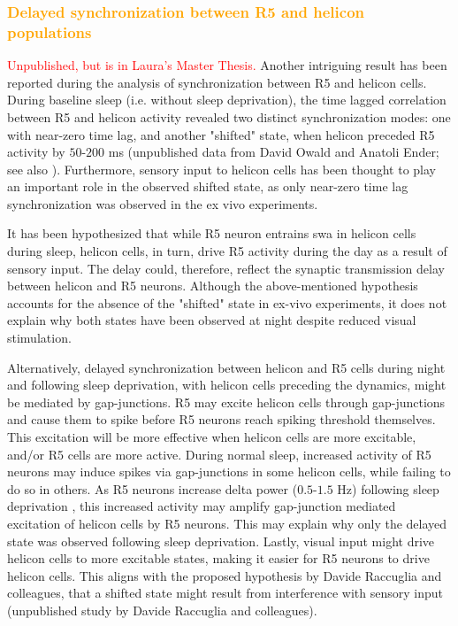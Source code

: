 \documentclass[../main.tex]{subfiles}
\begin{document}
\subsubsection{\textcolor{orange}{Delayed synchronization between R5 and helicon populations}}\label{subsubsec:delayed_synch_r5_helicon}

\textcolor{red}{Unpublished, but is in Laura's Master Thesis.} Another intriguing result has been reported during the analysis of synchronization between R5 and helicon cells. During baseline sleep (i.e. without sleep deprivation), the time lagged correlation between R5 and helicon activity revealed two distinct synchronization modes: one with near-zero time lag, and another "shifted" state, when helicon preceded R5 activity by $50$-$200$ ms (unpublished data from David Owald and Anatoli Ender; see also \parencite{krummSlowlyOscillatingBrain2021}).
Furthermore, sensory input to helicon cells has been thought to play an important role in the observed shifted state, as only near-zero time lag synchronization was observed in the ex vivo experiments.

It has been hypothesized that while R5 neuron entrains \gls{swa} in helicon cells during sleep, helicon cells, in turn, drive R5 activity during the day as a result of sensory input. The delay could, therefore, reflect the synaptic transmission delay between helicon and R5 neurons. Although the above-mentioned hypothesis accounts for the absence of the "shifted" state in ex-vivo experiments, it does not explain why both states have been observed at night despite reduced visual stimulation.

Alternatively, delayed synchronization between helicon and R5 cells during night and following sleep deprivation, with helicon cells preceding the dynamics, might be mediated by gap-junctions.
R5 may excite helicon cells through gap-junctions and cause them to spike before R5 neurons reach spiking threshold themselves. This excitation will be more effective when helicon cells are more excitable, and/or R5 cells are more active.
During normal sleep, increased activity of R5 neurons may induce spikes via gap-junctions in some helicon cells, while failing to do so in others. As R5 neurons increase delta power ($0.5$-$1.5$ Hz) following sleep deprivation \parencite{raccugliaNetworkSpecificSynchronizationElectrical2019}, this increased activity may amplify gap-junction mediated excitation of helicon cells by R5 neurons. This may explain why only the delayed state was observed following sleep deprivation. Lastly, visual input might drive helicon cells to more excitable states, making it easier for R5 neurons to drive helicon cells. This aligns with the proposed hypothesis by Davide Raccuglia and colleagues, that a shifted state might result from interference with sensory input (unpublished study by Davide Raccuglia and colleagues).
\end{document}
